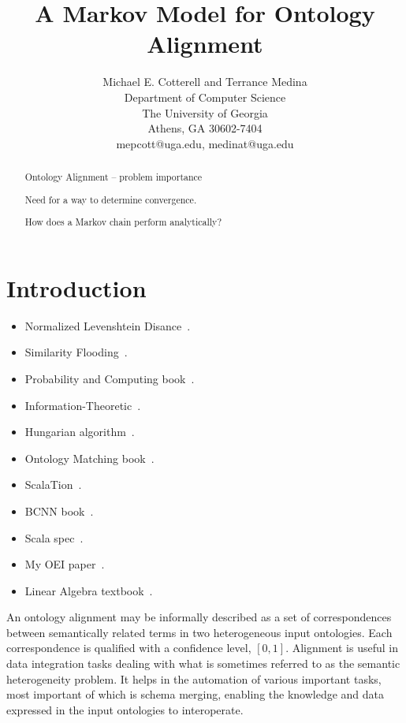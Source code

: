 \documentclass[letterpaper,twocolumn,12pt]{article}
\begin{document}
\newtheorem{defn}{Definition}

\title{A Markov Model for Ontology Alignment}

\author{Michael E. Cotterell and Terrance Medina \\
Department of Computer Science \\
The University of Georgia \\
Athens, GA 30602-7404 \\
mepcott@uga.edu, medinat@uga.edu
}

\maketitle

\begin{abstract}
Ontology Alignment -- problem importance

Need for a way to determine convergence.

How does a Markov chain perform analytically?

\end{abstract}


\section{Introduction}

\begin{itemize}
\item Normalized Levenshtein Disance~\cite{yujian:2007:levenshtein}. 
\item Similarity Flooding~\cite{melnik:2002:similarity}.
\item Probability and Computing book~\cite{mitzenmacher:2005:probability}.
\item Information-Theoretic~\cite{lin:1998:information}.
\item Hungarian algorithm~\cite{kuhn:1955:hungarian}.
\item Ontology Matching book~\cite{euzenat:2007:ontology}.
\item ScalaTion~\cite{miller:2010:scalation}.
\item BCNN book~\cite{bcnn:2010:simulation}.
\item Scala spec~\cite{odersky:2011:spec}.
\item My OEI paper~\cite{cotterell:2012:oei}.
\item Linear Algebra textbook~\cite{goodaire:2003:linalgebra}.
\end{itemize}

An ontology alignment may be informally described as a set of correspondences 
between semantically related terms in two heterogeneous input ontologies. 
Each correspondence is qualified with a confidence level, $[0,1]$.
Alignment is useful in data integration tasks dealing with what is sometimes 
referred to as the semantic heterogeneity problem. 
It helps in the automation of various important tasks, most important of which 
is schema merging, enabling the knowledge and data expressed in the input 
ontologies to interoperate. \\
\end{document}
